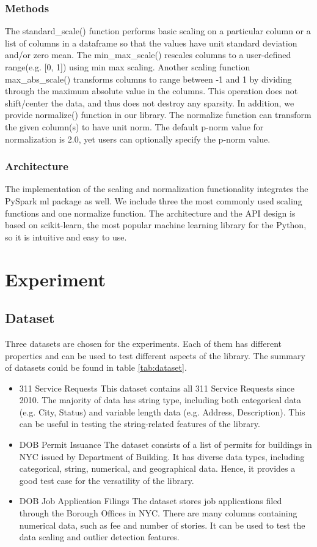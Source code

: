 \documentclass[sigconf]{acmart}
\begin{document}
\subsubsection{Methods}
The standard\_scale() function performs basic scaling on a particular column or a list of columns in a dataframe so that the values have unit standard deviation and/or zero mean. The min\_max\_scale() rescales columns to a user-defined range(e.g. [0, 1]) using min max scaling. Another scaling function max\_abs\_scale() transforms columns to range between -1 and 1 by dividing through the maximum absolute value in the columns. This operation does not shift/center the data, and thus does not destroy any sparsity. In addition, we provide normalize() function in our library. The normalize function can transform the given column(s) to have unit norm. The default p-norm value for normalization is 2.0, yet users can optionally specify the p-norm value.  
\subsubsection{Architecture}
The implementation of the scaling and normalization functionality integrates the PySpark ml package as well. We include three the most commonly used scaling functions and one normalize function. The architecture and the API design is based on scikit-learn, the most popular machine learning library for the Python, so it is intuitive and easy to use. 
\section{Experiment}
\subsection{Dataset}
Three datasets are chosen for the experiments. Each of them has different properties and can be used to test different aspects of the library. The summary of datasets could be found in table \ref{tab:dataset}.
\begin{itemize}
	\item{311 Service Requests}\cite{nycopendata1} This dataset contains all 311 Service Requests since 2010. The majority of data has string type, including both categorical  data (e.g. City, Status) and variable length data (e.g. Address, Description). This can be useful in testing the string-related features of the library.
	\item{DOB Permit Issuance}\cite{nycopendata2} The dataset consists of a list of permits for buildings in NYC issued by Department of Building. It has diverse data types, including categorical, string, numerical, and geographical data. Hence, it provides a good test case for the versatility of the library. 
	\item{DOB Job Application Filings}\cite{nycopendata3} The dataset stores job applications filed through the Borough Offices in NYC. There are many columns containing numerical data, such as fee and number of stories. It can be used to test the data scaling and outlier detection features. 
\end{itemize}
\end{document}
